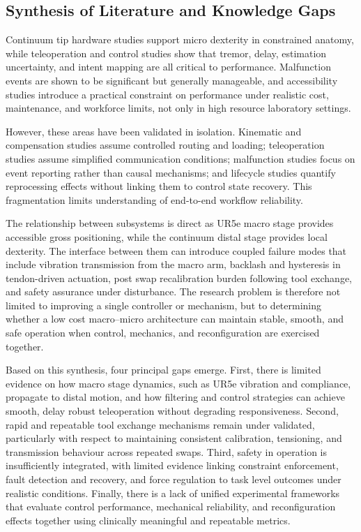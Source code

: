 \documentclass[12pt]{article}
\begin{document}
\subsection{Synthesis of Literature and Knowledge Gaps}

Continuum tip hardware studies support
micro dexterity in constrained anatomy, while teleoperation and control studies
show that tremor, delay, estimation uncertainty, and intent mapping are all
critical to performance. Malfunction events are shown to be significant but
generally manageable, and accessibility studies introduce a
practical constraint on performance under realistic cost,
maintenance, and workforce limits, not only in high resource laboratory settings.

However, these areas have been validated in isolation. Kinematic and
compensation studies assume controlled routing and loading; teleoperation
studies assume simplified communication conditions; malfunction studies focus
on event reporting rather than causal mechanisms; and lifecycle studies quantify
reprocessing effects without linking them to control state recovery. This
fragmentation limits understanding of end-to-end workflow reliability.

The relationship between subsystems is direct as UR5e
macro stage provides accessible gross positioning, while the continuum distal
stage provides local dexterity. The interface between them can introduce
coupled failure modes that include vibration transmission from the macro arm,
backlash and hysteresis in tendon-driven actuation, post swap recalibration
burden following tool exchange, and safety assurance under disturbance. The
research problem is therefore not limited to improving a single controller or
mechanism, but to determining whether a low cost macro--micro architecture can
maintain stable, smooth, and safe operation when control, mechanics, and
reconfiguration are exercised together.

Based on this synthesis, four principal gaps emerge. First, there is limited
evidence on how macro stage dynamics, such as UR5e vibration and compliance,
propagate to distal motion, and how filtering and control strategies can achieve
smooth, delay robust teleoperation without degrading responsiveness. Second,
rapid and repeatable tool exchange mechanisms remain under validated, particularly
with respect to maintaining consistent calibration, tensioning, and transmission
behaviour across repeated swaps. Third, safety in operation is insufficiently
integrated, with limited evidence linking constraint enforcement, fault
detection and recovery, and force regulation to task level outcomes under
realistic conditions. Finally, there is a lack of unified experimental frameworks
that evaluate control performance, mechanical reliability, and reconfiguration
effects together using clinically meaningful and repeatable metrics.
\end{document}
